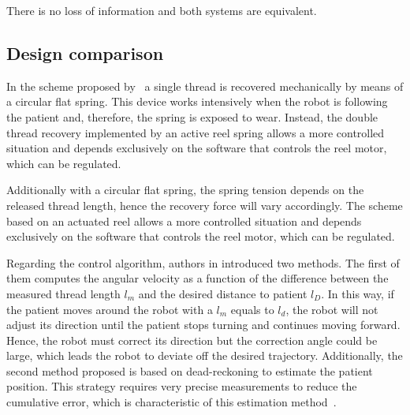 \documentclass[journal]{IEEEtran}
\begin{document}
There is no loss of information and both systems are equivalent.

\subsection{Design comparison}

In the scheme proposed by~\cite{Endo2015} a single thread is recovered mechanically by means of a circular flat spring. This device works intensively when the robot is following the patient and, therefore, the spring is exposed to wear. Instead, the double thread recovery implemented by an active reel spring allows a more controlled situation and depends exclusively on the software that controls the reel motor, which can be regulated.

Additionally with a circular flat spring, the spring tension depends on the released thread length, hence the recovery force will vary accordingly. The scheme based on an actuated reel allows a more controlled situation and depends exclusively on the software that controls the reel motor, which can be regulated.

Regarding the control algorithm, authors in \cite{Endo2015} introduced two methods. The first of them computes the angular velocity as a  function of the difference between the measured thread length $l_m$ and the desired distance to patient  $l_D$. In this way, if the patient moves around the robot with a $l_m$ equals to $l_d$, the robot will not adjust its direction until the patient stops turning and continues moving forward. Hence, the robot must correct its direction but the correction angle could be large, which leads the robot to deviate off the desired trajectory. Additionally, the second method proposed is based on dead-reckoning to estimate the patient position. This strategy requires very precise measurements to reduce the cumulative error, which is characteristic of this estimation method~\cite{DurrantWhyte1994}.


\end{document}
